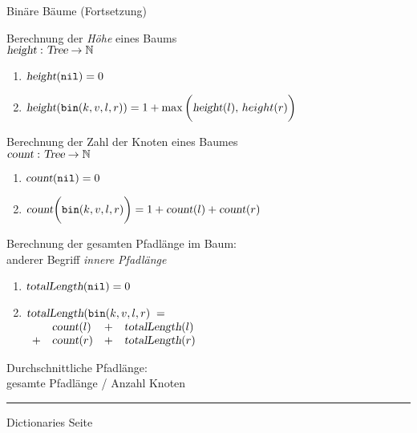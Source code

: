 
\begin{slide}{}
\normalsize

\begin{center}
Bin\"are B\"aume (Fortsetzung)
\end{center}
\vspace*{0.5cm}

\footnotesize
Berechnung der \textsl{H\"ohe} eines Baums \\[0.3cm]
\hspace*{1.3cm} $\textsl{height}: \textsl{Tree} \rightarrow \mathbb{N}$
\begin{enumerate}
\item $\textsl{height}(\mathtt{nil}) = 0$
\item $\textsl{height}(\mathtt{bin}(k,v,l,r)) = 1 + \max\bigg( \textsl{height}(l),\, height(r)\bigg)$
\end{enumerate}
Berechnung der Zahl der Knoten eines Baumes \\[0.3cm]
\hspace*{1.3cm} $\textsl{count}: \textsl{Tree} \rightarrow \mathbb{N}$
\begin{enumerate}
\item $\textsl{count}(\mathtt{nil}) = 0$
\item $\textsl{count}\bigg(\mathtt{bin}(k,v,l,r)\bigg) = 1 + \textsl{count}(l) + \textsl{count}(r)$
\end{enumerate}

Berechnung der gesamten Pfadl\"ange im Baum: \\[0.3cm]
anderer Begriff \emph{innere Pfadl\"ange}
\begin{enumerate}
\item $\textsl{totalLength}(\mathtt{nil}) = 0$
\item $\textsl{totalLength}(\mathtt{bin}(k,v,l,r) \;= $\\[0.3cm]
\hspace*{1.3cm} $
\begin{array}{llclc}
     & \textsl{count}(l) & + & \textsl{totalLength}(l)  \\
   + & \textsl{count}(r) & + & \textsl{totalLength}(r) \\
\end{array}$
\end{enumerate}
Durchschnittliche Pfadl\"ange: \\[0.3cm]
\hspace*{1.3cm} gesamte Pfadl\"ange / Anzahl Knoten


\vspace*{\fill}
\tiny \addtocounter{mypage}{1}
\rule{17cm}{1mm}
Dictionaries  \hspace*{\fill} Seite 
\end{slide}

